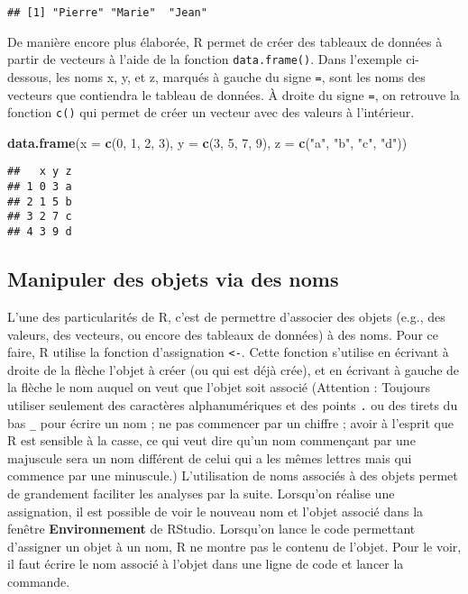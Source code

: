 \documentclass[
  french,
]{book}
\newenvironment{Shaded}{\begin{snugshade}}{\end{snugshade}}
\newcommand{\DataTypeTok}[1]{\textcolor[rgb]{0.13,0.29,0.53}{#1}}
\newcommand{\DecValTok}[1]{\textcolor[rgb]{0.00,0.00,0.81}{#1}}
\newcommand{\KeywordTok}[1]{\textcolor[rgb]{0.13,0.29,0.53}{\textbf{#1}}}
\newcommand{\NormalTok}[1]{#1}
\newcommand{\StringTok}[1]{\textcolor[rgb]{0.31,0.60,0.02}{#1}}
\begin{document}
\begin{verbatim}
## [1] "Pierre" "Marie"  "Jean"
\end{verbatim}

De manière encore plus élaborée, R permet de créer des tableaux de données à partir de vecteurs à l'aide de la fonction \texttt{data.frame()}. Dans l'exemple ci-dessous, les noms x, y, et z, marqués à gauche du signe \texttt{=}, sont les noms des vecteurs que contiendra le tableau de données. À droite du signe \texttt{=}, on retrouve la fonction \texttt{c()} qui permet de créer un vecteur avec des valeurs à l'intérieur.

\begin{Shaded}
\begin{Highlighting}[]
\KeywordTok{data.frame}\NormalTok{(}\DataTypeTok{x =} \KeywordTok{c}\NormalTok{(}\DecValTok{0}\NormalTok{, }\DecValTok{1}\NormalTok{, }\DecValTok{2}\NormalTok{, }\DecValTok{3}\NormalTok{), }
           \DataTypeTok{y =} \KeywordTok{c}\NormalTok{(}\DecValTok{3}\NormalTok{, }\DecValTok{5}\NormalTok{, }\DecValTok{7}\NormalTok{, }\DecValTok{9}\NormalTok{), }
           \DataTypeTok{z =} \KeywordTok{c}\NormalTok{(}\StringTok{"a"}\NormalTok{, }\StringTok{"b"}\NormalTok{, }\StringTok{"c"}\NormalTok{, }\StringTok{"d"}\NormalTok{))}
\end{Highlighting}
\end{Shaded}

\begin{verbatim}
##   x y z
## 1 0 3 a
## 2 1 5 b
## 3 2 7 c
## 4 3 9 d
\end{verbatim}

\hypertarget{manipuler-des-objets-via-des-noms}{%
\subsection{Manipuler des objets via des noms}\label{manipuler-des-objets-via-des-noms}}

L'une des particularités de R, c'est de permettre d'associer des objets (e.g., des valeurs, des vecteurs, ou encore des tableaux de données) à des noms. Pour ce faire, R utilise la fonction d'assignation \texttt{\textless{}-}. Cette fonction s'utilise en écrivant à droite de la flèche l'objet à créer (ou qui est déjà crée), et en écrivant à gauche de la flèche le nom auquel on veut que l'objet soit associé (Attention : Toujours utiliser seulement des caractères alphanumériques et des points \texttt{.} ou des tirets du bas \texttt{\_} pour écrire un nom ; ne pas commencer par un chiffre ; avoir à l'esprit que R est sensible à la casse, ce qui veut dire qu'un nom commençant par une majuscule sera un nom différent de celui qui a les mêmes lettres mais qui commence par une minuscule.) L'utilisation de noms associés à des objets permet de grandement faciliter les analyses par la suite. Lorsqu'on réalise une assignation, il est possible de voir le nouveau nom et l'objet associé dans la fenêtre \textbf{Environnement} de RStudio. Lorsqu'on lance le code permettant d'assigner un objet à un nom, R ne montre pas le contenu de l'objet. Pour le voir, il faut écrire le nom associé à l'objet dans une ligne de code et lancer la commande.
\end{document}
